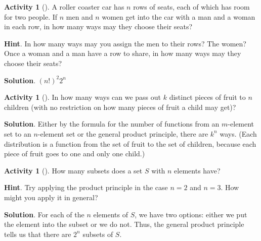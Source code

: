 \documentclass[10pt,]{book}
\theoremstyle{plain}
\theoremstyle{definition}
\theoremstyle{definition}
\theoremstyle{definition}
\newtheorem{activity}[project]{Activity}
\numberwithin{equation}{chapter}
\begin{document}
\begin{activity}[]\label{activity-80}
\hypertarget{p-641}{}%
A roller coaster car has \(n\) rows of seats, each of which has room for two people. If \(n\) men and \(n\) women get into the car with a man and a woman in each row, in how many ways may they choose their seats?%
\par\smallskip%
\noindent\textbf{Hint}.\hypertarget{hint-41}{}\quad%
\hypertarget{p-642}{}%
In how many ways may you assign the men to their rows? The women? Once a woman and a man have a row to share, in how many ways may they choose their seats?%
\par\smallskip%
\noindent\textbf{Solution}.\hypertarget{solution-38}{}\quad%
\hypertarget{p-643}{}%
\((n!)^2 2^n\)%
\end{activity}
\begin{activity}[]\label{activity-81}
\hypertarget{p-644}{}%
In how many ways can we pass out \(k\) distinct pieces of fruit to \(n\) children (with no restriction on how many pieces of fruit a child may get)?%
\par\smallskip%
\noindent\textbf{Solution}.\hypertarget{solution-39}{}\quad%
\hypertarget{p-645}{}%
Either by the formula for the number of functions from an \(m\)-element set to an \(n\)-element set or the general product principle, there are \(k^n\) ways. (Each distribution is a function from the set of fruit to the set of children, because each piece of fruit goes to one and only one child.)%
\end{activity}
\begin{activity}[]\label{SubsetsFirstTime}
\hypertarget{p-646}{}%
How many subsets does a set \(S\) with \(n\) elements have?%
\par\smallskip%
\noindent\textbf{Hint}.\hypertarget{hint-42}{}\quad%
\hypertarget{p-647}{}%
Try applying the product principle in the case \(n = 2\) and \(n = 3\). How might you apply it in general?%
\par\smallskip%
\noindent\textbf{Solution}.\hypertarget{solution-40}{}\quad%
\hypertarget{p-648}{}%
For each of the \(n\) elements of \(S\), we have two options: either we put the element into the subset or we do not. Thus, the general product principle tells us that there are \(2^n\) subsets of \(S\).%
\end{activity}
\end{document}
